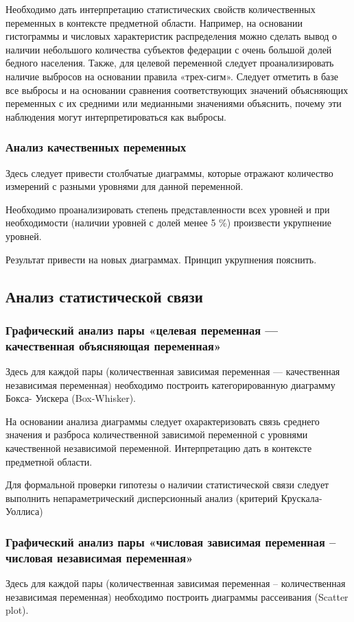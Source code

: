 \documentclass[12pt]{article}
\begin{document}
Необходимо дать интерпретацию статистических свойств количественных переменных в контексте предметной области. Например, на основании гистограммы и числовых характеристик распределения можно сделать вывод о наличии небольшого количества субъектов федерации с очень большой долей бедного населения. Также, для целевой переменной следует проанализировать наличие выбросов на основании правила «трех-сигм». Следует отметить в базе все выбросы и на основании сравнения соответствующих значений объясняющих переменных с их средними или медианными значениями объяснить, почему эти наблюдения могут
интерпретироваться как выбросы.

\subsubsection{Анализ качественных переменных}
Здесь следует привести столбчатые диаграммы, которые отражают количество измерений с разными уровнями для данной переменной.

Необходимо проанализировать степень представленности всех уровней и при
необходимости (наличии уровней с долей менее 5 \%) произвести укрупнение уровней.

Результат привести на новых диаграммах. Принцип укрупнения пояснить.

\subsection{Анализ статистической связи}
\subsubsection{Графический анализ пары «целевая переменная  --- качественная объясняющая переменная»}
Здесь для каждой пары (количественная зависимая переменная --- качественная
независимая переменная) необходимо построить категорированную диаграмму Бокса-
Уискера (Box-Whisker).

На основании анализа диаграммы следует охарактеризовать связь среднего
значения и разброса количественной зависимой переменной с уровнями качественной
независимой переменной. Интерпретацию дать в контексте предметной области.

Для формальной проверки гипотезы о наличии статистической связи следует
выполнить непараметрический дисперсионный анализ (критерий Крускала-Уоллиса)

\subsubsection{Графический анализ пары «числовая зависимая переменная – числовая
независимая переменная»}
Здесь для каждой пары (количественная зависимая переменная – количественная
независимая переменная) необходимо построить диаграммы рассеивания (Scatter plot).
\end{document}
